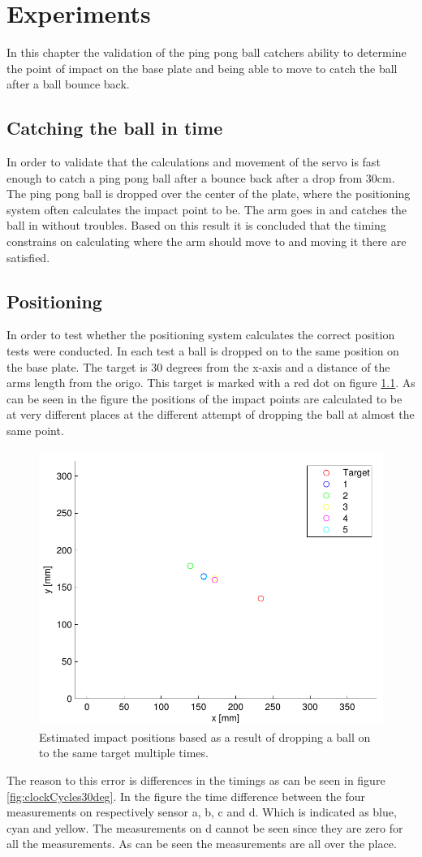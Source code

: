\chapter{Experiments} %
\label{chap:experiments}
In this chapter the validation of the ping pong ball catchers ability to determine the point of impact on the base plate and being able to move to catch the ball after a ball bounce back.
\section{Catching the ball in time}
In order to validate that the calculations and movement of the servo is fast enough to catch a ping pong ball after a bounce back after a drop from $30\si{\centi\meter}$. The ping pong ball is dropped over the center of the plate, where the positioning system often calculates the impact point to be. The arm goes in and catches the ball in without troubles. 
Based on this result it is concluded that the timing constrains on calculating where the arm should move to and moving it there are satisfied.
\section{Positioning}
In order to test whether the positioning system calculates the correct position tests were conducted.
In each test a ball is dropped on to the same position on the base plate. The target is 30 degrees from the x-axis and a distance of the arms length from the origo. This target is marked with a red dot on figure \ref{fig:testRes30deg}. 
As can be seen in the figure the positions of the impact points are calculated to be at very different places at the different attempt of dropping the ball at almost the same point.
\begin{figure}[htb]
	\centering
	\includegraphics[width=.8\textwidth]{figures/testRes30deg.pdf}
	\caption{Estimated impact positions based as a result of dropping a ball on to the same target multiple times.}
	\label{fig:testRes30deg}
\end{figure}
The reason to this error is differences in the timings as can be seen in figure \ref{fig:clockCycles30deg}. In the figure the time difference between the four measurements on respectively sensor a, b, c and d. Which is indicated as blue, cyan and yellow. The measurements on d cannot be seen since they are zero for all the measurements. As can be seen the measurements are all over the place.

